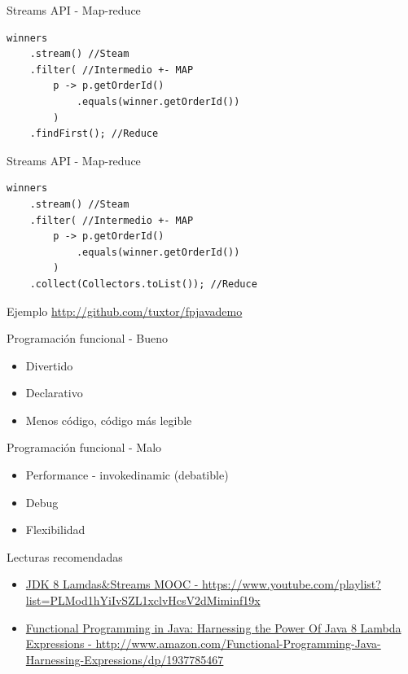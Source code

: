 \documentclass{beamer}
\begin{document}
\begin{frame}[fragile]{Streams API - Map-reduce}
    \small
\begin{lstlisting}
winners
	.stream() //Steam
	.filter( //Intermedio +- MAP
		p -> p.getOrderId()
			.equals(winner.getOrderId())
		)
	.findFirst(); //Reduce
\end{lstlisting}
\end{frame}

\begin{frame}[fragile]{Streams API - Map-reduce}
    \small
\begin{lstlisting}
winners
	.stream() //Steam
	.filter( //Intermedio +- MAP
		p -> p.getOrderId()
			.equals(winner.getOrderId())
		)
	.collect(Collectors.toList()); //Reduce
\end{lstlisting}
\end{frame}

\begin{frame}{Ejemplo}
	\href{http://github.com/tuxtor/fpjavademo}{http://github.com/tuxtor/fpjavademo}
\end{frame}

\begin{frame}{Programación funcional - Bueno}
	\begin{itemize}
	\item Divertido
	\item Declarativo
	\item Menos código, código más legible
	\end{itemize}
\end{frame}

\begin{frame}{Programación funcional - Malo}
	\begin{itemize}
	\item Performance - invokedinamic (debatible)
	\item Debug
	\item Flexibilidad
	\end{itemize}
\end{frame}

\begin{frame}{Lecturas recomendadas}
	\begin{itemize}
	\item  \scriptsize  \href{https://www.youtube.com/playlist?list=PLMod1hYiIvSZL1xclvHcsV2dMiminf19x}{JDK 8 Lamdas\&Streams MOOC - https://www.youtube.com/playlist?list=PLMod1hYiIvSZL1xclvHcsV2dMiminf19x}
	\item  \href{http://www.amazon.com/Functional-Programming-Java-Harnessing-Expressions/dp/1937785467}{Functional Programming in Java: Harnessing the Power Of Java 8 Lambda Expressions - http://www.amazon.com/Functional-Programming-Java-Harnessing-Expressions/dp/1937785467}
	\end{itemize}
\end{frame}
\end{document}
